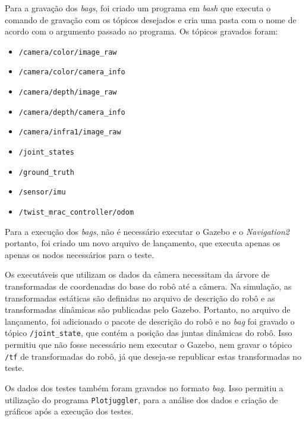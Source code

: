 \documentclass[repeatfields,xlists,xpacks,oneside,yearsonly]{ufrgscca}
\begin{document}
Para a gravação dos \textit{bags}, foi criado um programa em \textit{bash} 
que executa o comando de gravação com os tópicos desejados e cria uma pasta 
com o nome de acordo com o argumento passado ao programa.
Os tópicos gravados foram:
\begin{itemize}
    \item \texttt{/camera/color/image\_raw}
    \item \texttt{/camera/color/camera\_info}
    \item \texttt{/camera/depth/image\_raw}
    \item \texttt{/camera/depth/camera\_info}
    \item \texttt{/camera/infra1/image\_raw}
    \item \texttt{/joint\_states}
    \item \texttt{/ground\_truth}
    \item \texttt{/sensor/imu}
    \item \texttt{/twist\_mrac\_controller/odom}
\end{itemize}




Para a execução dos \textit{bags}, não é necessário executar o Gazebo e o 
\textit{Navigation2} portanto, foi criado um novo arquivo de lançamento,
que executa apenas os apenas os nodos necessários para o teste.

Os executáveis que utilizam os dados da câmera necessitam da árvore de
transformadas de coordenadas do base do robô até a câmera.
Na simulação, as transformadas estáticas são definidas no arquivo de descrição
do robô e as transformadas dinâmicas são publicadas pelo Gazebo.
Portanto, no arquivo de lançamento, foi adicionado o pacote 
de descrição do robô e no \textit{bag} foi gravado o tópico
\texttt{/joint\_state}, que contém a posição das juntas dinâmicas do robô.
Isso permitiu que não fosse necessário nem executar o Gazebo, nem gravar
o tópico \texttt{/tf} de transformadas do robô, já que deseja-se republicar
estas transformadas no teste.

Os dados dos testes também foram gravados no formato \textit{bag}. 
Isso permitiu a utilização do programa 
\texttt{Plotjuggler}, para a análise
dos dados e criação de gráficos após a execução dos testes.
\end{document}
